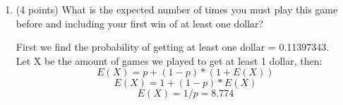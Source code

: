 \documentclass[10pt,letterpaper,unboxed,cm]{article}
\begin{document}
\begin{enumerate}
\begin{enumerate}
\begin{solution}
\end{solution}

\item (4 points)
What is the expected number of times you must play this game before and including your first win of at least one dollar?

\begin{solution}
    
    First we find the probability of getting at least one dollar = 0.11397343. \\
    Let X be the amount of games we played to get at least 1 dollar, then:
    \[E(X) = p + (1 - p) * (1 + E(X))\]
    \[E(X) = 1 + (1 - p) * E(X)\]
    \[E(X) = 1/p = \boxed{8.774}\]

\end{solution}

\end{enumerate}



\end{enumerate}
\end{document}
